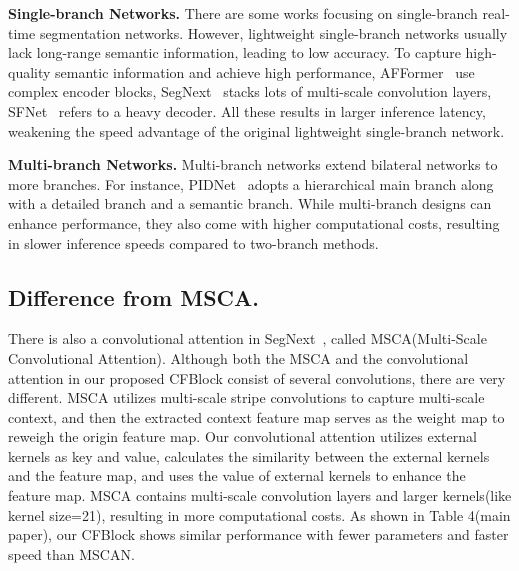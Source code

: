 \documentclass[letterpaper]{article} %
\begin{document}
\noindent
\textbf{Single-branch Networks.} There are some works focusing on single-branch real-time segmentation networks. However, lightweight single-branch networks usually lack long-range semantic information, leading to low accuracy. To capture high-quality semantic information and achieve high performance, AFFormer~\cite{dong2023afformer} use complex encoder blocks, SegNext~\cite{guo2022segnext} stacks lots of multi-scale convolution layers, SFNet~\cite{li2022sfnet} refers to a heavy decoder. All these results in larger inference latency, weakening the speed advantage of the original lightweight single-branch network.


\noindent
\textbf{Multi-branch Networks.} Multi-branch networks extend bilateral networks to more branches. For instance, PIDNet~\cite{xu2023pidnet} adopts a hierarchical main branch along with a detailed branch and a semantic branch. While multi-branch designs can enhance performance, they also come with higher computational costs, resulting in slower inference speeds compared to two-branch methods.




\subsection{Difference from MSCA.}
There is also a convolutional attention in SegNext~\cite{guo2022segnext}, called MSCA(Multi-Scale Convolutional Attention). Although both the MSCA and the convolutional attention in our proposed CFBlock consist of several convolutions, there are very different. MSCA utilizes multi-scale stripe convolutions to capture multi-scale context, and then the extracted context feature map serves as the weight map to reweigh the origin feature map. Our convolutional attention utilizes external kernels as key and value, calculates the similarity between the external kernels and the feature map, and uses the value of external kernels to enhance the feature map. MSCA contains multi-scale convolution layers and larger kernels(like kernel size=21), resulting in more computational costs. As shown in Table 4(main paper), our CFBlock shows similar performance with fewer parameters and faster speed than MSCAN.
\end{document}

